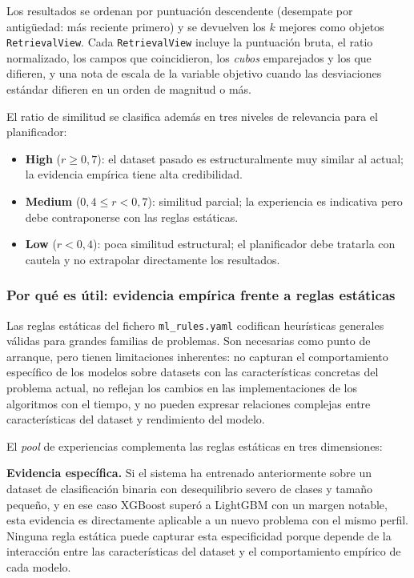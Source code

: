 Los resultados se ordenan por puntuación descendente (desempate por antigüedad: más reciente primero) y se devuelven los $k$ mejores como objetos \texttt{RetrievalView}. Cada \texttt{RetrievalView} incluye la puntuación bruta, el ratio normalizado, los campos que coincidieron, los \emph{cubos} emparejados y los que difieren, y una nota de escala de la variable objetivo cuando las desviaciones estándar difieren en un orden de magnitud o más.

El ratio de similitud se clasifica además en tres niveles de relevancia para el planificador:
\begin{itemize}
  \item \textbf{High} ($r \geq 0{,}7$): el dataset pasado es estructuralmente muy similar al actual; la evidencia empírica tiene alta credibilidad.
  \item \textbf{Medium} ($0{,}4 \leq r < 0{,}7$): similitud parcial; la experiencia es indicativa pero debe contraponerse con las reglas estáticas.
  \item \textbf{Low} ($r < 0{,}4$): poca similitud estructural; el planificador debe tratarla con cautela y no extrapolar directamente los resultados.
\end{itemize}

\subsubsection*{Por qué es útil: evidencia empírica frente a reglas estáticas}
\label{sec:experience-value}

Las reglas estáticas del fichero \texttt{ml\_rules.yaml} codifican heurísticas generales válidas para grandes familias de problemas. Son necesarias como punto de arranque, pero tienen limitaciones inherentes: no capturan el comportamiento específico de los modelos sobre datasets con las características concretas del problema actual, no reflejan los cambios en las implementaciones de los algoritmos con el tiempo, y no pueden expresar relaciones complejas entre características del dataset y rendimiento del modelo.

El \emph{pool} de experiencias complementa las reglas estáticas en tres dimensiones:

\textbf{Evidencia específica.} Si el sistema ha entrenado anteriormente sobre un dataset de clasificación binaria con desequilibrio severo de clases y tamaño pequeño, y en ese caso XGBoost superó a LightGBM con un margen notable, esta evidencia es directamente aplicable a un nuevo problema con el mismo perfil. Ninguna regla estática puede capturar esta especificidad porque depende de la interacción entre las características del dataset y el comportamiento empírico de cada modelo.

